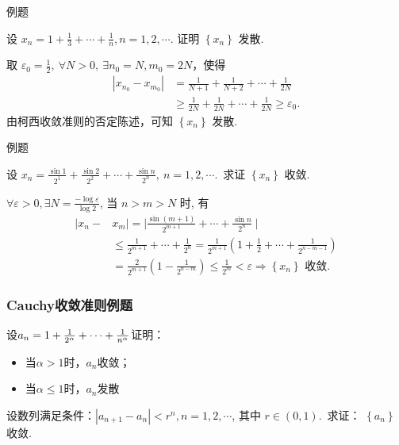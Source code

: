 \documentclass[mathserif]{beamer}
\begin{document}
\begin{frame}{例题}%
\begin{ex}
	\suojin 设 $x_n=1+\frac{1}{3}+\cdots+\frac{1}{n}, n=1,2, \cdots$. 证明 $\left\{x_n\right\}$ 发散.
\end{ex}
\pause
\begin{proofs}
	\suojin  取 $\varepsilon_0=\frac{1}{2},\ \forall N>0,\ \exists n_0=N, m_0=2 N$，使得
	$$
	\begin{aligned}
		\left|x_{n_0}-x_{m_0}\right| & =\frac{1}{N+1}+\frac{1}{N+2}+\cdots+\frac{1}{2 N} \\
		& \geq \frac{1}{2 N}+\frac{1}{2 N}+\cdots+\frac{1}{2 N} \geq \varepsilon_0 .
	\end{aligned}
	$$
	\suojin 由柯西收敛准则的否定陈述，可知 $\left\{x_n\right\}$ 发散. 
\end{proofs}   
\end{frame}




\begin{frame}{例题}%
\begin{ex}
	\suojin 设 $x_n=\frac{\sin 1}{2^1}+\frac{\sin 2}{2^2}+\cdots+\frac{\sin n}{2^n},\ n=1,2, \cdots$.\ 求证 $\left\{x_n\right\}$ 收敛.  
\end{ex}
\pause
\begin{proofs}
	\suojin $\forall \varepsilon>0, \exists N=\frac{-\log \varepsilon}{\log 2}$, 当 $n>m>N$ 时, 有
	$$
	\begin{aligned}
		\mid x_n- & x_m|=| \frac{\sin (m+1)}{2^{m+1}}+\cdots+\frac{\sin n}{2^n} \mid \\
		& \leq \frac{1}{2^{m+1}}+\cdots+\frac{1}{2^n}=\frac{1}{2^{m+1}}\left(1+\frac{1}{2}+\cdots+\frac{1}{2^{n-m-1}}\right) \\
		& =\frac{2}{2^{m+1}}\left(1-\frac{1}{2^{n-m}}\right) \leq \frac{1}{2^m}<\varepsilon \Rightarrow\left\{x_n\right\} \text { 收敛. }
	\end{aligned}
	$$ 
\end{proofs}
\end{frame}




\begin{frame}[label=li_bc2]
\frametitle{Cauchy收敛准则例题}
\begin{ex}
\suojin 设$a_{n}=1+\frac{1}{2^{\alpha}}+\cdots+\frac{1}{n^{\alpha}}$\jh 证明：
\begin{itemize}
\item[(1)\ ] 当$\alpha>1$时，$a_{n}$收敛；
\item[(2)\ ] 当$\alpha\leqslant 1$时，$a_{n}$发散\jh
\end{itemize}
\end{ex}
\jiange
	\begin{ex}
	\suojin 设数列满足条件：$\left|a_{n+1}-a_n\right|<r^n, n=1,2, \cdots$, 其中 $r \in(0,1)$.\ 求证： $\left\{a_n\right\}$收敛.
	\end{ex}
\hfill\hyperlink{li_bc4jd<1>}{}
\end{frame}
\end{document}
